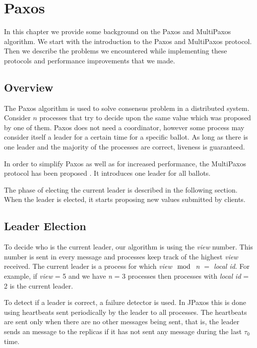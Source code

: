 \chapter{Paxos}

In this chapter we provide some background on the Paxos and MultiPaxos algorithm. We start with the introduction to the Paxos and MultiPaxos protocol. Then we describe the problems we encountered while implementing these protocols and performance improvements that we made.

\section{Overview}
The Paxos algorithm is used to solve consensus problem in a distributed system. Consider $n$ processes that try to decide upon the same value which was proposed by one of them. Paxos does not need a coordinator, however some process may consider itself a leader for a certain time for a specific ballot. As long as there is one leader and the majority of the processes are correct, liveness is guaranteed.

In order to simplify Paxos as well as for increased performance, the MultiPaxos protocol has been proposed \cite{Lam01}. It introduces one leader for all ballots.

The phase of electing the current leader is described in the following section. When the leader is elected, it starts proposing new values submitted by clients.


\section{Leader Election}
\label{sec:leader_election}
\indent\par

To decide who is the current leader, our algorithm is using the \textit{view} number. This number is sent in every message and processes keep track of the highest \textit{view} received. The current leader is a process for which \textit{view $\mod$ n $=$ local id}. For example, if \textit{view} = 5 and we have \textit{n} = 3 processes then processes with \textit{local id} = 2 is the current leader.

To detect if a leader is correct, a failure detector is used. In JPaxos this is done using heartbeats sent periodically by the leader to all processes. The heartbeats are sent only when there are no other messages being sent, that is, the leader sends an \alive message to the replicas if it has not sent any message during the last $\tau_0$ time.

